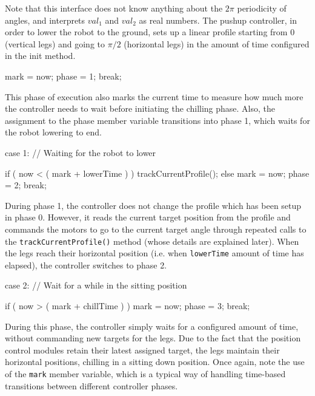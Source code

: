 Note that this interface does not know anything about the $2 \pi$
periodicity of angles, and interprets $val_1$ and $val_2$ as real
numbers. The pushup controller, in order to lower the robot to the ground,
sets up a linear profile starting from 0 (vertical legs) and going to
$\pi/2$ (horizontal legs) in the amount of time configured in the init method.

\begin{codesegment}
    mark = now;
    phase = 1;
    break;
\end{codesegment}

This phase of execution also marks the current time to measure how much more 
the controller needs to wait before initiating the chilling phase. Also, the
assignment to the phase member variable transitions into phase 1, which
waits for the robot lowering to end.

\begin{codesegment}
  case 1:   // Waiting for the robot to lower

    if ( now < ( mark + lowerTime ) )
      trackCurrentProfile();
    else {
      mark = now;
      phase = 2;
    }
    break;
\end{codesegment}

During phase 1, the controller does not change the profile which has been
setup in phase 0. However, it reads the current target position from the
profile and commands the motors to go to the current target angle through
repeated calls to the {\tt trackCurrentProfile()} method (whose details are
explained later). When the legs reach their horizontal position
(i.e. when {\tt lowerTime} amount of time has elapsed), the controller
switches to phase 2.

\begin{codesegment}
  case 2:   // Wait for a while in the sitting position

    if ( now > ( mark + chillTime ) ) {
      mark = now;
      phase = 3;
    }
    break;
\end{codesegment}

During this phase, the controller simply waits for a configured amount of
time, without commanding new targets for the legs. Due to the fact that the
position control modules retain their latest assigned target, the legs
maintain their horizontal positions, chilling in a sitting down
position. Once again, note the use of the {\tt mark} member variable, which
is a typical way of handling time-based transitions between different
controller phases.


